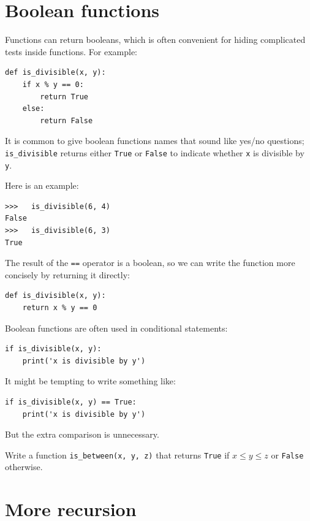 \documentclass[10pt]{book}
\begin{document}
\section{Boolean functions}
\label{boolean}


Functions can return booleans, which is often convenient for hiding
complicated tests inside functions.  For example:

\beforeverb
\begin{verbatim}
def is_divisible(x, y):
    if x % y == 0:
        return True
    else:
        return False
\end{verbatim}
\afterverb
%
It is common to give boolean functions names that sound like yes/no
questions; \verb"is_divisible" returns either {\tt True} or {\tt False}
to indicate whether {\tt x} is divisible by {\tt y}.

Here is an example:

\beforeverb
\begin{verbatim}
>>>   is_divisible(6, 4)
False
>>>   is_divisible(6, 3)
True
\end{verbatim}
\afterverb
%
The result of the {\tt ==} operator is a boolean, so we can write the
function more concisely by returning it directly:

\beforeverb
\begin{verbatim}
def is_divisible(x, y):
    return x % y == 0
\end{verbatim}
\afterverb
%
Boolean functions are often used in conditional statements:


\beforeverb
\begin{verbatim}
if is_divisible(x, y):
    print('x is divisible by y')
\end{verbatim}
\afterverb
%
It might be tempting to write something like:

\beforeverb
\begin{verbatim}
if is_divisible(x, y) == True:
    print('x is divisible by y')
\end{verbatim}
\afterverb
%
But the extra comparison is unnecessary.

\begin{ex}
Write a function \verb"is_between(x, y, z)" that
returns {\tt True} if $x \le y \le z$ or {\tt False} otherwise.
\end{ex}


\section{More recursion}
\end{document}
